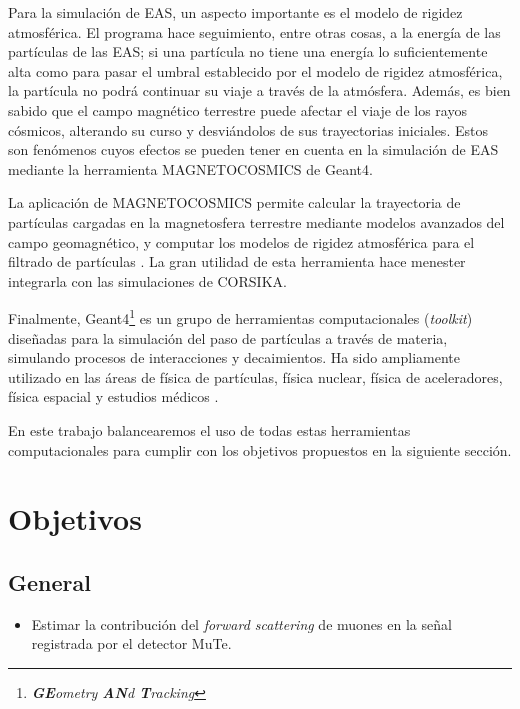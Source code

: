 \documentclass[12pt]{report}
\begin{document}
Para la simulación de EAS, un aspecto importante es el modelo de rigidez atmosférica. El programa hace seguimiento, entre otras cosas, a la energía de las partículas de las EAS; si una partícula no tiene una energía lo suficientemente alta como para pasar el umbral establecido por el modelo de rigidez atmosférica, la partícula no podrá continuar su viaje a través de la atmósfera. Además, es bien sabido que el campo magnético terrestre puede afectar el viaje de los rayos cósmicos, alterando su curso y desviándolos de sus trayectorias iniciales. Estos son fenómenos cuyos efectos se pueden tener en cuenta en la simulación de EAS mediante la herramienta MAGNETOCOSMICS de Geant4.

La aplicación de MAGNETOCOSMICS permite calcular la trayectoria de partículas cargadas en la magnetosfera terrestre mediante modelos avanzados del campo geomagnético, y computar los modelos de rigidez atmosférica para el filtrado de partículas \cite{magnetocosmics}. La gran utilidad de esta herramienta hace menester integrarla con las simulaciones de CORSIKA.

Finalmente, Geant4\footnote{\textit{\textbf{GE}ometry \textbf{AN}d \textbf{T}racking}} es un grupo de herramientas computacionales (\textit{toolkit}) diseñadas para la simulación del paso de partículas a través de materia, simulando procesos de interacciones y decaimientos. Ha sido ampliamente utilizado en las áreas de física de partículas, física nuclear, física de aceleradores, física espacial y estudios médicos \cite{agostinelli2003geant4}.

En este trabajo balancearemos el uso de todas estas herramientas computacionales para cumplir con los objetivos propuestos en la siguiente sección.














\section*{Objetivos}

\subsection*{General}
\begin{itemize}
    \item Estimar la contribución del \textit{forward scattering} de muones en la señal registrada por el detector MuTe.
\end{itemize}
\end{document}
